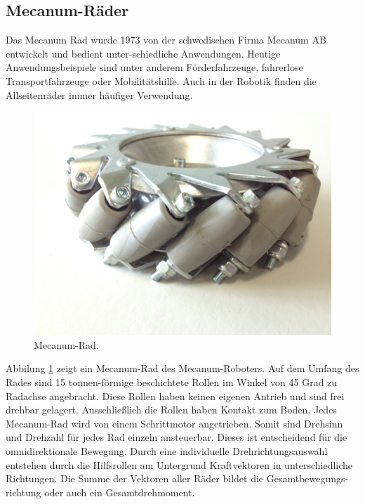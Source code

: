 \subsection{Mecanum-Räder}
\label{sec:Mecanum-Räder}
Das Mecanum Rad wurde 1973 von der schwedischen Firma Mecanum AB entwickelt und bedient unter-schiedliche Anwendungen. Heutige Anwendungsbeispiele sind unter anderem Förderfahrzeuge, fahrerlose Transportfahrzeuge oder Mobilitätshilfe. Auch in der Robotik finden die Allseitenräder immer häufiger Verwendung.
\begin{figure}[H]
\centering
 \includegraphics[width=.6\textwidth]{Abbildungen/Mecanumrad} 
\caption[Mecanum-Rad]{Mecanum-Rad.}
\label{fig:Mecanum-Rad}
\end{figure}
Abbilung \ref{fig:Mecanum-Rad} zeigt ein Mecanum-Rad des Mecanum-Roboters. Auf dem Umfang des Rades sind 15 tonnen-förmige beschichtete Rollen im Winkel von 45 Grad zu Radachse angebracht. Diese Rollen haben keinen eigenen Antrieb und sind frei drehbar gelagert. Ausschließlich die Rollen haben Kontakt zum Boden.
Jedes Mecanum-Rad wird von einem Schrittmotor angetrieben. Somit sind Drehsinn und Drehzahl für jedes Rad einzeln ansteuerbar. Dieses ist entscheidend für die omnidirektionale Bewegung.
Durch eine individuelle Drehrichtungsauswahl entstehen durch die Hilfsrollen am Untergrund Kraftvektoren in unterschiedliche Richtungen. Die Summe der Vektoren aller Räder bildet die Gesamtbewegungs-richtung oder auch ein Gesamtdrehmoment.

